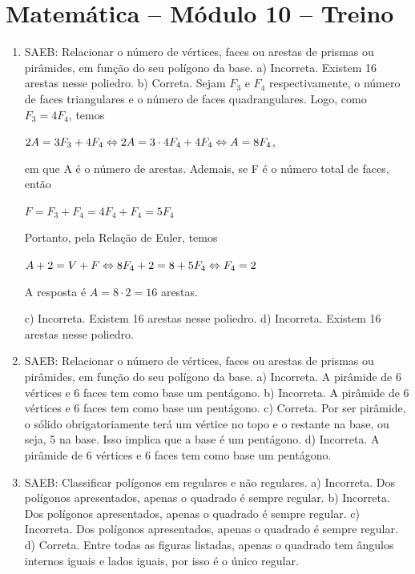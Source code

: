 \section*{Matemática – Módulo 10 – Treino}

\begin{enumerate}
\item
SAEB: Relacionar o número de vértices, faces ou arestas de prismas ou pirâmides, em função do seu polígono da base.
a) Incorreta. Existem 16 arestas nesse poliedro.
b) Correta. Sejam $F_3$ e $F_4$ respectivamente, o número de faces triangulares 
e o número de faces quadrangulares. Logo, como $F_3 = 4F_4$, temos

$2A = 3F_3 + 4F_4 \Leftrightarrow 2A = 3 \cdot 4F_4 + 4F_4 \\
\Leftrightarrow A = 8F_4$,

em que A é o número de arestas.
Ademais, se F é o número total de faces, então

$F = F_3 + F_4 = 4F_4 + F_4 = 5F_4$

Portanto, pela Relação de Euler, temos

$A + 2 = V + F \Leftrightarrow 8F_4 + 2 = 8 + 5F_4 \\
\Leftrightarrow F_4 = 2$

A resposta é $A = 8 \cdot 2 = 16$ arestas.

c) Incorreta. Existem 16 arestas nesse poliedro.
d) Incorreta. Existem 16 arestas nesse poliedro.

\item
SAEB: Relacionar o número de vértices, faces ou arestas de prismas ou pirâmides, em função do seu polígono da base.
a) Incorreta. A pirâmide de 6 vértices e 6 faces tem como base um pentágono.
b) Incorreta. A pirâmide de 6 vértices e 6 faces tem como base um pentágono.
c) Correta. Por ser pirâmide, o sólido obrigatoriamente terá um vértice no topo 
e o restante na base, ou seja, 5 na base. Isso implica que a base é um
pentágono.
d) Incorreta. A pirâmide de 6 vértices e 6 faces tem como base um pentágono.

\item
SAEB: Classificar polígonos em regulares e não regulares.
a) Incorreta. Dos polígonos apresentados, apenas o quadrado é sempre regular. 
b) Incorreta. Dos polígonos apresentados, apenas o quadrado é sempre regular. 
c) Incorreta. Dos polígonos apresentados, apenas o quadrado é sempre regular. 
d) Correta. Entre todas as figuras listadas, apenas o quadrado tem ângulos
internos iguais e lados iguais, por isso é o único regular.
\end{enumerate}

